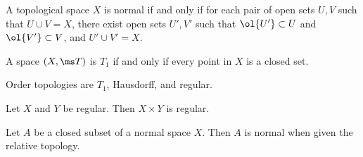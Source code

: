\documentclass{fkpset}
\begin{document}

  \begin{problem}
    A topological space $X$ is normal if and only if for each pair of
    open sets $U,V$ such that $U \cup V = X$, there exist open sets
    $U', V'$ such that $\ol{U'} \subset U$ and $\ol{V'} \subset V$,
    and $U' \cup V' = X$.
  \end{problem}
  \begin{solution}
  \end{solution}
  \clearpage

  \begin{problem}[5.15]
    A space $(X, \ms T)$ is $T_1$ if and only if every point in $X$ is
    a closed set.
  \end{problem}
  \begin{solution}
    Order topologies are $T_1$, Hausdorff, and regular.
  \end{solution}
  \clearpage

  \begin{problem}[5.17]
    Let $X$ and $Y$ be regular. Then $X \times Y$ is regular.
  \end{problem}
  \begin{solution}
  \end{solution}
  \clearpage

  \begin{problem}[5.23]
    Let $A$ be a closed subset of a normal space $X$. Then $A$ is
    normal when given the relative topology.
  \end{problem}
  \begin{solution}
  \end{solution}
\end{document}
